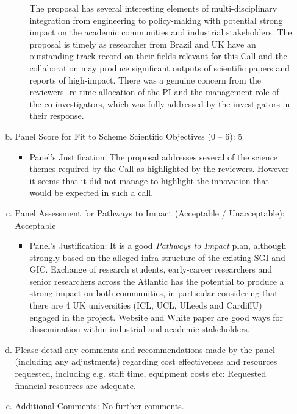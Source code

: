 \documentclass[14pt,twoside]{report}
\begin{document}
\begin{enumerate}[{\bf 1.}]
\begin{enumerate}[(a)]
\begin{itemize}
The proposal has several interesting elements of multi-disciplinary integration from engineering to policy-making with potential strong impact on the academic communities and industrial stakeholders. The proposal is timely as researcher from Brazil and UK have an outstanding track record on their fields relevant for this Call and the collaboration may produce significant outputs of scientific papers and reports of high-impact. There was a genuine concern from the reviewers -re time allocation of the PI and the management role of the co-investigators, which was fully addressed by the investigators in their response.  
            \end{itemize}
%
            \item Panel Score for Fit to Scheme Scientific Objectives (0 -- 6): 5
            \begin{itemize}
            \item Panel's Justification: The proposal addresses several of the science themes required by the Call as highlighted by the reviewers. However it seems that it did not manage to highlight the innovation that would be expected in such a call.
            \end{itemize}
%
            \item Panel Assessment for Pathways to Impact (Acceptable / Unacceptable): Acceptable
            \begin{itemize}
               \item Panel's Justification: It is a good {\it Pathways to Impact} plan, although strongly based on the alleged infra-structure of the existing SGI and GIC. Exchange of research students, early-career researchers and senior researchers across the Atlantic has the potential to produce a strong impact on both communities, in particular considering that there are 4 UK universities (ICL, UCL, ULeeds and CardiffU) engaged in the project. Website and White paper are good ways for dissemination within industrial and academic stakeholders.
            \end{itemize}
%
            \item Please detail any comments and recommendations made by the panel (including any adjustments) regarding cost effectiveness and resources requested, including e.g. staff time, equipment costs etc: Requested financial resources are adequate.
%
            \item Additional Comments: No further comments.
%
        \end{enumerate}
%
  \end{enumerate}
\end{document}
